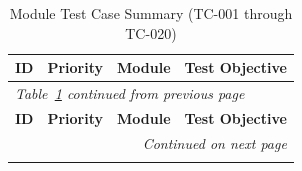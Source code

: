 \documentclass[12pt,letterpaper]{article}
\begin{document}
{\small
\begin{longtable}{|c|c|>{\raggedright\arraybackslash}p{3cm}|>{\raggedright\arraybackslash}p{6.5cm}|}
\caption{Module Test Case Summary (TC-001 through TC-020)}\label{tab:test-summary}\\
\hline
\rowcolor{TableHeader}\textcolor{TableHeaderText}{\textbf{ID}} & \textcolor{TableHeaderText}{\textbf{Priority}} & \textcolor{TableHeaderText}{\textbf{Module}} & \textcolor{TableHeaderText}{\textbf{Test Objective}} \\
\hline
\endfirsthead
\multicolumn{4}{l}{\small\itshape\color{gray} Table~\ref{tab:test-summary} continued from previous page}\\[0.5em]
\hline
\rowcolor{TableHeader}\textcolor{TableHeaderText}{\textbf{ID}} & \textcolor{TableHeaderText}{\textbf{Priority}} & \textcolor{TableHeaderText}{\textbf{Module}} & \textcolor{TableHeaderText}{\textbf{Test Objective}} \\
\hline
\endhead
\hline
\multicolumn{4}{r}{\small\itshape\color{gray} Continued on next page}\\
\endfoot
\hline
\endlastfoot


\end{longtable}}
\end{document}
